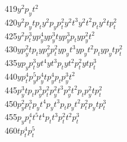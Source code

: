 \begin{tabbing}
419\>$y  ^2 p_yt  ^2    $\\
420\>$y  ^2 p_yt  p_t   $\>$y  ^2 p_yp_t^2    $\>$y  ^2 t  ^3       $\>$y  ^2 t  ^2 p_t   $\>$y  ^2 t  p_t^2    $\\
425\>$y  ^2 p_t^3       $\>$y  p_y^4          $\>$y  p_y^3 t        $\>$y  p_y^3 p_t      $\>$y  p_y^2 t  ^2    $\\
430\>$y  p_y^2 t  p_t   $\>$y  p_y^2 p_t^2    $\>$y  p_yt  ^3       $\>$y  p_yt  ^2 p_t   $\>$y  p_yt  p_t^2    $\\
435\>$y  p_yp_t^3       $\>$y  t  ^4          $\>$y  t  ^3 p_t      $\>$y  t  ^2 p_t^2    $\>$y  t  p_t^3       $\\
440\>$y  p_t^4          $\>$p_y^5             $\>$p_y^4 t           $\>$p_y^4 p_t         $\>$p_y^3 t  ^2       $\\
445\>$p_y^3 t  p_t      $\>$p_y^3 p_t^2       $\>$p_y^2 t  ^3       $\>$p_y^2 t  ^2 p_t   $\>$p_y^2 t  p_t^2    $\\
450\>$p_y^2 p_t^3       $\>$p_yt  ^4          $\>$p_yt  ^3 p_t      $\>$p_yt  ^2 p_t^2    $\>$p_yt  p_t^3       $\\
455\>$p_yp_t^4          $\>$t  ^5             $\>$t  ^4 p_t         $\>$t  ^3 p_t^2       $\>$t  ^2 p_t^3       $\\
460\>$t  p_t^4          $\>$p_t^5             $
\end{tabbing}

